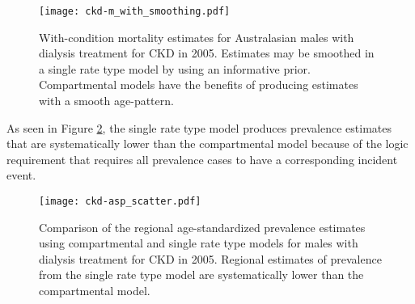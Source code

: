    \begin{figure}[h]
        \begin{center}
            \texttt{[image: ckd-m\_with\_smoothing.pdf]}
            \caption{With-condition mortality estimates for Australasian males with dialysis treatment for CKD in 2005.  Estimates may be smoothed in a single rate type model by using an informative prior.  Compartmental models have the benefits of producing estimates with a smooth age-pattern.}
            \label{fig:app-CKD smooth}
        \end{center}
    \end{figure}

As seen in Figure \ref{fig:app-CKD asp}, the single rate type model produces prevalence estimates that are systematically lower than the compartmental model because of the logic requirement that requires all prevalence cases to have a corresponding incident event.

    \begin{figure}[h]
        \begin{center}
            \texttt{[image: ckd-asp\_scatter.pdf]}
            \caption{Comparison of the regional age-standardized prevalence estimates using compartmental and single rate type models for males with dialysis treatment for CKD in 2005.  Regional estimates of prevalence from the single rate type model are systematically lower than the compartmental model.}
            \label{fig:app-CKD asp}
        \end{center}
    \end{figure} 